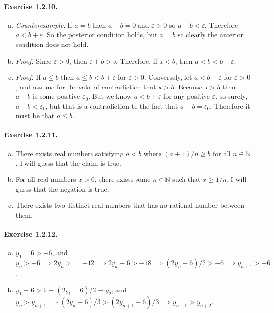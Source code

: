 \documentclass{article}
\begin{document}
\paragraph{Exercise 1.2.10.}
\begin{enumerate}[(a)]
    \item \textit{Counterexample.} If $a=b$ then $a-b=0$ and $\varepsilon > 0$ so $a-b < \varepsilon$. Therefore $a<b+\varepsilon$. So the posterior condition holds, but $a=b$ so clearly the anterior condition does not hold.
    \item \textit{Proof.} Since $\varepsilon > 0$, then $\varepsilon + b > b$. Therefore, if $a<b$, then $a<b<b+\varepsilon$.
    \item \textit{Proof.} If $a\leq b$ then $a\leq b < b+\varepsilon$ for $\varepsilon > 0$. Conversely, let $a<b+\varepsilon$ for $\varepsilon > 0$, and assume for the sake of contradiction that $a > b$. Because $a > b$ then $a-b$ is some positive $\varepsilon_0$. But we know $a<b+\varepsilon$ for any positive $\varepsilon$. so surely, $a-b<\varepsilon_0$, but that is a contradiction to the fact that $a-b=\varepsilon_0$. Therefore it must be that $a\leq b$.
\end{enumerate}

\paragraph{Exercise 1.2.11.}
\begin{enumerate}[(a)]
    \item There exists real numbers satisfying $a<b$ where $(a+1)/n \geq b$ for all $n\in \mathbb{N}$. I will guess that the claim is true.
    \item For all real numbers $x>0$, there exists some $n\in \mathbb{N}$ such that $x\geq 1/n$. I will guess that the negation is true.
    \item There exists two distinct real numbers that has no rational number between them.
\end{enumerate}

\paragraph{Exercise 1.2.12.}
\begin{enumerate}[(a)]
    \item $y_1=6>-6$, and $y_n>-6 \implies 2y_n > =-12 \implies 2y_n -6 > -18 \implies (2y_n-6)/3 > -6 \implies y_{n+1} > -6$.
    \item $y_1=6 > 2 = (2y_1-6)/3=y_2$, and $y_n>y_{n+1} \implies (2y_n-6)/3 > (2y_{n+1}-6)/3 \implies y_{n+1} > y_{n+2}$.
\end{enumerate}
\end{document}
